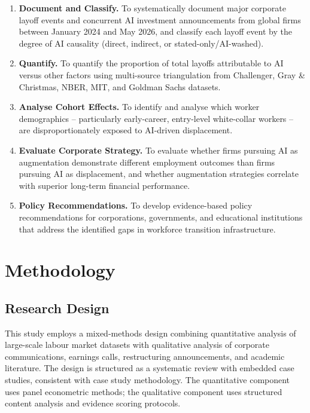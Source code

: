 \documentclass[12pt, a4paper]{article}
\begin{document}
\begin{enumerate}[leftmargin=*, label=\textbf{Objective \arabic*:}]
  \item \textbf{Document and Classify.} To systematically document major corporate layoff events
        and concurrent AI investment announcements from global firms between January 2024 and
        May 2026, and classify each layoff event by the degree of AI causality (direct, indirect,
        or stated-only/AI-washed).
  \item \textbf{Quantify.} To quantify the proportion of total layoffs attributable to AI versus
        other factors using multi-source triangulation from Challenger, Gray \& Christmas, NBER,
        MIT, and Goldman Sachs datasets.
  \item \textbf{Analyse Cohort Effects.} To identify and analyse which worker demographics --
        particularly early-career, entry-level white-collar workers -- are disproportionately
        exposed to AI-driven displacement.
  \item \textbf{Evaluate Corporate Strategy.} To evaluate whether firms pursuing AI as augmentation
        demonstrate different employment outcomes than firms pursuing AI as displacement, and
        whether augmentation strategies correlate with superior long-term financial performance.
  \item \textbf{Policy Recommendations.} To develop evidence-based policy recommendations for
        corporations, governments, and educational institutions that address the identified gaps
        in workforce transition infrastructure.
\end{enumerate}

\section{Methodology}

\subsection{Research Design}

This study employs a mixed-methods design combining quantitative analysis of large-scale
labour market datasets with qualitative analysis of corporate communications, earnings calls,
restructuring announcements, and academic literature. The design is structured as a systematic
review with embedded case studies, consistent with \citet{yin2018} case study methodology.
The quantitative component uses panel econometric methods; the qualitative component uses
structured content analysis and evidence scoring protocols.
\end{document}
